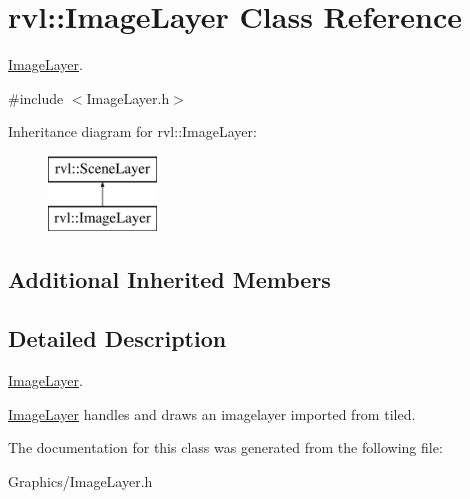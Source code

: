 \hypertarget{classrvl_1_1_image_layer}{}\section{rvl\+:\+:Image\+Layer Class Reference}
\label{classrvl_1_1_image_layer}


\hyperlink{classrvl_1_1_image_layer}{Image\+Layer}.  




{\ttfamily \#include $<$Image\+Layer.\+h$>$}

Inheritance diagram for rvl\+:\+:Image\+Layer\+:\begin{figure}[H]
\begin{center}
\leavevmode
\includegraphics[height=2.000000cm]{classrvl_1_1_image_layer}
\end{center}
\end{figure}
\subsection*{Additional Inherited Members}


\subsection{Detailed Description}
\hyperlink{classrvl_1_1_image_layer}{Image\+Layer}. 

\hyperlink{classrvl_1_1_image_layer}{Image\+Layer} handles and draws an imagelayer imported from tiled. 

The documentation for this class was generated from the following file\+:\begin{DoxyCompactItemize}
\item 
Graphics/Image\+Layer.\+h\end{DoxyCompactItemize}
